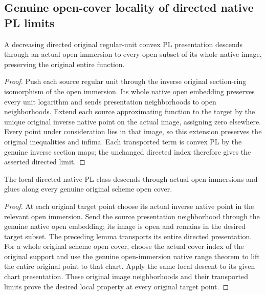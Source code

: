 \subsection{Genuine open-cover locality of directed native PL limits}

\begin{lemma}
\label{lem:fc-native-directed-pl-open-descent}
\leanok
A decreasing directed original regular-unit convex PL presentation descends
through an actual open immersion to every open subset of its whole native
image, preserving the original entire function.
\end{lemma}
\begin{proof}
Push each source regular unit through the inverse original section-ring
isomorphism of the open immersion. Its whole native open embedding preserves
every unit logarithm and sends presentation neighborhoods to open
neighborhoods. Extend each source approximating function to the target by the
unique original inverse native point on the actual image, assigning zero
elsewhere. Every point under consideration lies in that image, so this
extension preserves the original inequalities and infima. Each transported
term is convex PL by the genuine inverse section maps; the unchanged directed
index therefore gives the asserted directed limit.
\end{proof}

\begin{lemma}
\label{lem:fc-native-directed-pl-open-cover}
\leanok
{}
The local directed native PL class descends through actual open immersions
and glues along every genuine original scheme open cover.
\end{lemma}
\begin{proof}
At each original target point choose its actual inverse native point in the
relevant open immersion. Send the source presentation neighborhood through
the genuine native open embedding; its image is open and remains in the
desired target subset. The preceding lemma transports its entire directed
presentation. For a whole original scheme open cover, choose the actual
cover index of the original support and use the genuine open-immersion native
range theorem to lift the entire original point to that chart. Apply the same
local descent to its given chart presentation. These original image
neighborhoods and their transported limits prove the desired local property
at every original target point.
\end{proof}
